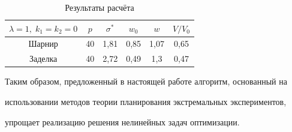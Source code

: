 \begin{table}[h!] \centering

\begin{minipage}{0.6\textwidth} \footnotesize

\caption{Результаты расчёта} \vspace{-3mm}

\begin{tabular}{c|c|c|c|c|c}

\hline

$\lambda =1,\; k_1 =k_2 =0$&

$p$ &

$\sigma ^\ast $&

$w_0 $ &

$w$ &

$V/V_0 $  \\

\hline

Шарнир&

40&

1,81&

0,85&

1,07&

0,65 \\

\hline

Заделка&

40&

2,72&

0,49&

1,3&

0,47 \\

\hline

\end{tabular}

\end{minipage}

\end{table}







Таким образом, предложенный в настоящей работе алгоритм, основанный на

использовании методов теории планирования экстремальных экспериментов,

упрощает реализацию решения нелинейных задач оптимизации.



